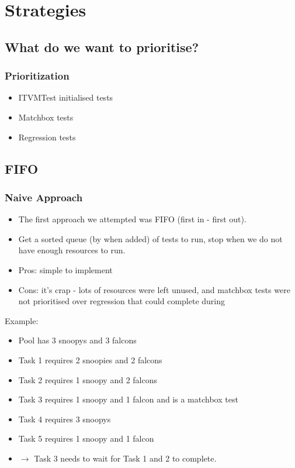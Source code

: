 \documentclass[xcolor=pdftex,dvipsnames,table]{beamer}
\begin{document}
\section{Strategies}
\subsection{What do we want to prioritise?}
\begin{frame}
\frametitle{Prioritization}
\begin{itemize}
  \item ITVMTest initialised tests
  \item Matchbox tests
  \item Regression tests
\end{itemize}
\end{frame}

\subsection{FIFO}
\begin{frame}
\frametitle{Naive Approach}
\begin{itemize}
  \item The first approach we attempted was FIFO (first in - first
    out).
  \item Get a sorted queue (by when added) of tests to run, stop when we do not have
    enough resources to run.
  \item Pros: simple to implement
  \item Cons: it's crap - lots of resources were left unused, and
    matchbox tests were not prioritised over regression that could
    complete during
\end{itemize}
\end{frame}

\begin{frame}
Example:
\begin{itemize}
  \item Pool has 3 snoopys and 3 falcons
  \item Task 1 requires 2 snoopies and 2 falcons
  \item Task 2 requires 1 snoopy and 2 falcons
  \item Task 3 requires 1 snoopy and 1 falcon and is a matchbox test
  \item Task 4 requires 3 snoopys
  \item Task 5 requires 1 snoopy and 1 falcon
  \item $\rightarrow$ Task 3 needs to wait for Task 1 and 2 to complete.
\end{itemize}
\end{frame}
\end{document}

